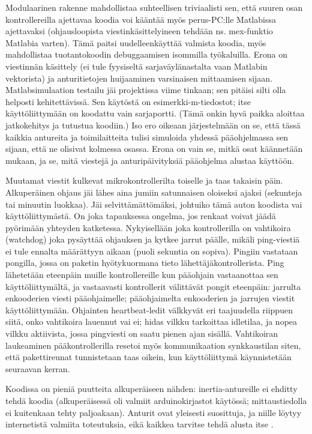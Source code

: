 \documentclass{article}
\begin{document}
Modulaarinen rakenne mahdollistaa suhteellisen triviaalisti sen, että suuren osan kontrollereilla ajettavaa koodia voi kääntää myös perus-PC:lle Matlabissa ajettavaksi (ohjausloopista viestinkäsittelyineen tehdään ns. mex-funktio Matlabia varten). Tämä paitsi uudelleenkäyttää valmista koodia, myös mahdollistaa tuotantokoodin debuggaamisen isommilla työkaluilla. Erona on viestinnän käsittely (ei tule fyysiseltä sarjaväylänastalta vaan Matlabin vektorista) ja anturitietojen huijaaminen varsinaisen mittaamisen sijaan. Matlabsimulaation testailu jäi projektissa viime tinkaan; sen pitäisi silti olla helposti kehitettävissä. Sen käytöstä on esimerkki-m-tiedostot; itse käyttöliittymään on koodattu vain sarjaportti. (Tämä onkin hyvä paikka aloittaa jatkokehitys ja tutustua koodiin.) Iso ero oikeaan järjestelmään on se, että tässä kaikkia antureita ja toimilaitteita tulisi simuloida yhdessä pääohjelmassa sen sijaan, että ne olisivat kolmessa osassa. Erona on vain se, mitkä osat käännetään mukaan, ja se, mitä viestejä ja anturipäivityksiä pääohjelma alustaa käyttöön.

Muutamat viestit kulkevat mikrokontrollerilta toiselle ja taas takaisin päin. Alkuperäinen ohjaus jäi lähes aina jumiin satunnaisen oloiseksi ajaksi (sekunteja tai minuutin luokkaa). Jäi selvittämättömäksi, johtuiko tämä auton koodista vai käyttöliittymästä. On joka tapauksessa ongelma, jos renkaat voivat jäädä pyörimään yhteyden katketessa. Nykyisellään joka kontrollerilla on vahtikoira (watchdog) joka pysäyttää ohjauksen ja kytkee jarrut päälle, mikäli ping-viestiä ei tule ennalta määrättyyn aikaan (puoli sekuntia on sopiva). Pingiin vastataan pongilla, jossa on paketin hyötykuormana tieto lähettäjäkontrollerista. Ping lähetetään eteenpäin muille kontrollereille kun pääohjain vastaanottaa sen käyttöliittymältä, ja vastaavasti kontrollerit välittävät pongit eteenpäin: jarrulta enkooderien viesti pääohjaimelle; pääohjaimelta enkooderien ja jarrujen viestit käyttöliittymään. Ohjainten heartbeat-ledit välkkyvät eri taajuudella riippuen siitä, onko vahtikoira lauennut vai ei; hidas vilkku tarkoittaa idletilaa, ja nopea vilkku aktiivista, jossa pingviesti on saatu pienen ajan sisällä. Vahtikoiran laukeaminen pääkontrollerilla resetoi myös kommunikaation synkkaustilan siten, että pakettireunat tunnistetaan taas oikein, kun käyttöliittymä käynnistetään seuraavan kerran.

Koodissa on pieniä puutteita alkuperäiseen nähden: inertia-antureille ei ehditty tehdä koodia (alkuperäisessä oli valmiit arduinokirjastot käytössä; mittaustiedolla ei kuitenkaan tehty paljoakaan). Anturit ovat yleisesti suosittuja, ja niille löytyy internetistä valmiita toteutuksia, eikä kaikkea tarvitse tehdä alusta itse \cite{bib:sparkfunacc} \cite{bib:sparkfungyro}.
\end{document}
